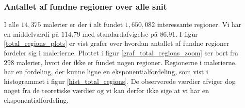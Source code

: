 {\subsubsection{Antallet af fundne regioner over alle snit}
I alle $14,375$ malerier er der i alt fundet $1,650,082$ interessante
regioner. Vi har en middelværdi på $114.79$ med standardafvigelse på
$86.91$. I figur \ref{total_regions_plots} er vist grafer over hvordan
antallet af fundne regioner fordeler sig i malerierne. Plottet i figur
\ref{graf_total_regions_zoom} ser bort fra $298$ malerier, hvori der
ikke er fundet nogen regioner. Regionerne i malerierne, har en
fordeling, der kunne ligne en eksponentialfordeling, som vist i
histogrammet i figur \ref{hist_total_regions}. De observerede værdier
afviger dog noget fra de teoretiske værdier og vi kan derfor ikke sige
at vi har en eksponentialfordeling.

}
